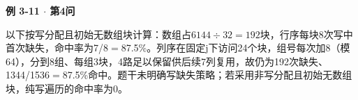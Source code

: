 {\color{ink}\bfseries 例 3-11 \(\cdot \) 第4问}\par\vspace{1bp}以下按写分配且初始无数组块计算：数组占\(6144\div 32=\allowbreak{}192\)块，行序每块8次写中首次缺失，命中率为7/\allowbreak{}8\(=\allowbreak{}\)87.5\%。列序在固定j下访问24个块，组号每次加8（模64），分到8组、每组3块，4路足以保留供后续7列复用，故仍为192次缺失、1344/\allowbreak{}1536\(=\allowbreak{}\)87.5\%命中。题干未明确写缺失策略；若采用非写分配且初始无数组块，纯写遍历的命中率为0。
